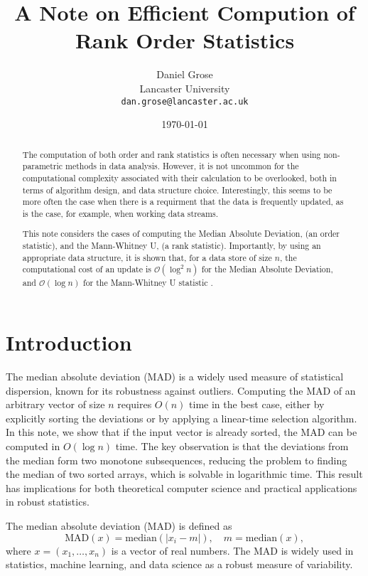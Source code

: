 \documentclass[11pt]{article}
\title{A Note on Efficient Compution of Rank Order Statistics}
\author{Daniel Grose \\ Lancaster University \\ \texttt{dan.grose@lancaster.ac.uk} }
\date{\today}
\begin{document}
\maketitle

\begin{abstract}
The computation of both order and rank statistics is often necessary when using non-parametric methods in data analysis. However, it is not uncommon for the computational
complexity associated with their calculation to be overlooked, both in terms of algorithm design, and data structure choice. Interestingly, this seems to be more
often the case when there is a requirment that the data is frequently updated, as is the case, for example, when working data streams.

This note considers the cases of computing the Median Absolute Deviation, (an order statistic), and the Mann-Whitney U, (a rank statistic).
Importantly, by using an appropriate data structure, it is shown that, for a data store of size $n$, the computational cost of an update is $\mathcal{O}(\log^{2}n)$ for the
Median Absolute Deviation, and $\mathcal{O}(\log n)$ for the Mann-Whitney U statistic .   
\end{abstract}


\section{Introduction}


The median absolute deviation (MAD) is a widely used measure of statistical dispersion, known for its robustness against outliers. Computing the MAD of an arbitrary vector of size $n$ requires $O(n)$ time in the best case, either by explicitly sorting the deviations or by applying a linear-time selection algorithm. In this note, we show that if the input vector is already sorted, the MAD can be computed in $O(\log n)$ time. The key observation is that the deviations from the median form two monotone subsequences, reducing the problem to finding the median of two sorted arrays, which is solvable in logarithmic time. This result has implications for both theoretical computer science and practical applications in robust statistics.


The median absolute deviation (MAD) is defined as
\[
\mathrm{MAD}(x) = \mathrm{median}(|x_i - m|), \quad m = \mathrm{median}(x),
\]
where $x = (x_1, \dots, x_n)$ is a vector of real numbers. The MAD is widely used in statistics, machine learning, and data science as a robust measure of variability.
\end{document}
